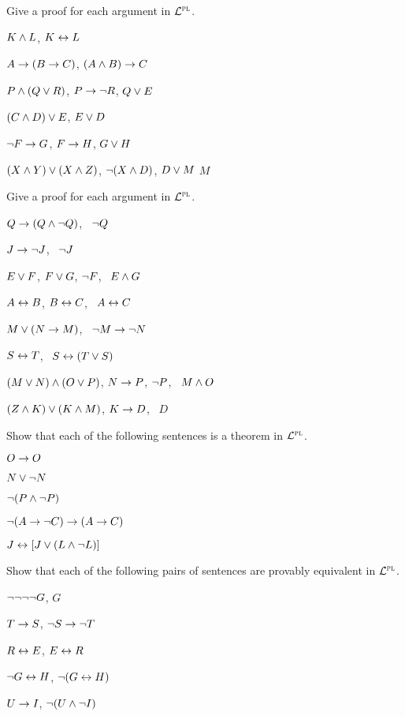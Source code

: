 \solutions
\problempart
\label{pr.solvedPLproofs}
Give a proof for each argument in $\mathcal{L}^{\textsc{pl}}$.
\begin{earg}
\item $K\wedge L$, \therefore $K\leftrightarrow L$
\item $A\rightarrow (B\rightarrow C)$, \therefore $(A\wedge B)\rightarrow C$
\item $P \wedge (Q\vee R)$, $P\rightarrow \neg R$, \therefore $Q\vee E$
\item $(C\wedge D)\vee E$, \therefore $E\vee D$
\item $\neg F\rightarrow G$, $F\rightarrow H$, \therefore $G\vee H$
\item $(X\wedge Y)\vee(X\wedge Z)$, $\neg(X\wedge D)$, $D\vee M$ \therefore $M$
\end{earg}

\problempart
Give a proof for each argument in $\mathcal{L}^{\textsc{pl}}$.
\begin{earg}
\item $Q\rightarrow(Q\wedge\neg Q)$, \therefore\ $\neg Q$
\item $J\rightarrow\neg J$, \therefore\ $\neg J$
\item $E\vee F$, $F\vee G$, $\neg F$, \therefore\ $E \wedge G$
\item $A\leftrightarrow B$, $B\leftrightarrow C$, \therefore\ $A\leftrightarrow C$
\item $M\vee(N\rightarrow M)$, \therefore\ $\neg M \rightarrow \neg N$
\item $S\leftrightarrow T$, \therefore\ $S\leftrightarrow (T\vee S)$
\item $(M \vee N) \wedge (O \vee P)$, $N \rightarrow P$, $\neg P$, \therefore\ $M\wedge O$
\item $(Z\wedge K) \vee (K\wedge M)$, $K \rightarrow D$, \therefore\ $D$
\end{earg}


\solutions
\problempart
\label{pr.PLND.theorems}
Show that each of the following sentences is a theorem in $\mathcal{L}^{\textsc{pl}}$.
\begin{earg}
\item $O \rightarrow O$
\item $N \vee \neg N$
\item $\neg(P\wedge \neg P)$
\item $\neg(A \rightarrow \neg C) \rightarrow (A \rightarrow C)$
\item $J \leftrightarrow [J\vee (L\wedge\neg L)]$
\end{earg}

\problempart
Show that each of the following pairs of sentences are provably equivalent in $\mathcal{L}^{\textsc{pl}}$.
\begin{earg}
\item $\neg\neg\neg\neg G$, $G$
\item $T\rightarrow S$, $\neg S \rightarrow \neg T$
\item $R \leftrightarrow E$, $E \leftrightarrow R$
\item $\neg G \leftrightarrow H$, $\neg(G \leftrightarrow H)$
\item $U \rightarrow I$, $\neg(U \wedge \neg I)$
\end{earg}

